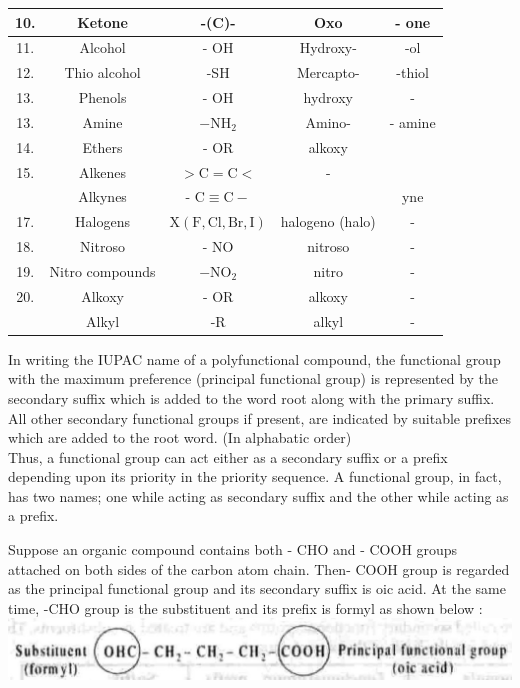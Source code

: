 \documentclass[10pt]{article}
\begin{document}
\begin{center}
\begin{tabular}{|c|c|c|c|c|}
\hline
10. & Ketone & -(C)- & Oxo & - one \\
\hline
11. & Alcohol & - OH & Hydroxy- & -ol \\
\hline
12. & Thio alcohol & -SH & Mercapto- & -thiol \\
\hline
13. & Phenols & - OH & hydroxy & - \\
\hline
13. & Amine & $-\mathrm{NH}_{2}$ & Amino- & - amine \\
\hline
14. & Ethers & - OR & alkoxy &  \\
\hline
15. & Alkenes & $>\mathrm{C}=\mathrm{C}<$ & - &  \\
\hline
 & Alkynes & - $\mathrm{C} \equiv \mathrm{C}-$ &  & yne \\
\hline
17. & Halogens & $\mathrm{X}(\mathrm{F}, \mathrm{Cl}, \mathrm{Br}, \mathrm{I})$ & halogeno (halo) & - \\
\hline
18. & Nitroso & - NO & nitroso & - \\
\hline
19. & Nitro compounds & $-\mathrm{NO}_{2}$ & nitro & - \\
\hline
20. & Alkoxy & - OR & alkoxy & - \\
\hline
 & Alkyl & -R & alkyl & - \\
\hline
\end{tabular}
\end{center}

In writing the IUPAC name of a polyfunctional compound, the functional group with the maximum preference (principal functional group) is represented by the secondary suffix which is added to the word root along with the primary suffix. All other secondary functional groups if present, are indicated by suitable prefixes which are added to the root word. (In alphabatic order)\\
Thus, a functional group can act either as a secondary suffix or a prefix depending upon its priority in the priority sequence. A functional group, in fact, has two names; one while acting as secondary suffix and the other while acting as a prefix.

Suppose an organic compound contains both - CHO and - COOH groups attached on both sides of the carbon atom chain. Then- COOH group is regarded as the principal functional group and its secondary suffix is oic acid. At the same time, -CHO group is the substituent and its prefix is formyl as shown below :\\
\includegraphics[max width=\textwidth, center]{2025_01_28_8470952b98110cec3aabg-026}
\end{document}
